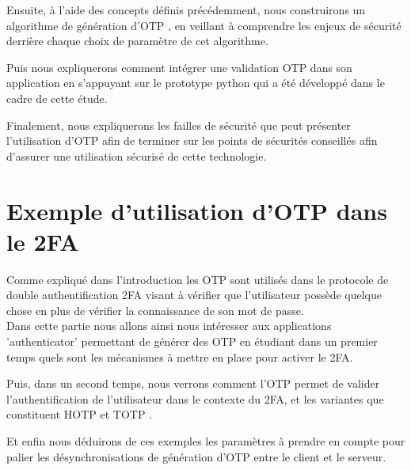 \documentclass[a4paper, 10pt]{article}
\newcommand{\otp}{\textsc{OTP} }
\newcommand{\totp}{\textsc{TOTP} }
\newcommand{\hotp}{\textsc{HOTP} }
\begin{document}
    Ensuite, à l'aide des concepts définis précédemment, nous construirons un \textcolor{myblue}{algorithme de génération d'\otp} , en veillant à comprendre les \textcolor{mygreen}{enjeux de sécurité} derrière chaque \textcolor{mygreen}{choix de paramètre} de cet algorithme.

    Puis nous expliquerons comment \textcolor{myblue}{intégrer une validation \otp} dans son application en s'appuyant sur le \textcolor{mygreen}{prototype python} qui a été développé dans le cadre de cette étude.

    Finalement, nous expliquerons les \textcolor{myblue}{failles de sécurité} que peut présenter l'utilisation d'\otp afin de terminer sur les \textcolor{mygreen}{points de sécurités conseillés} afin d'assurer une utilisation sécurisé de cette technologie.\\



\newpage
    \section{Exemple d'utilisation d'\otp dans le 2FA}


    Comme expliqué dans l'introduction les \otp sont utilisés dans le \textcolor{myblue}{protocole de double authentification} 2FA visant à vérifier que \textcolor{mygreen}{l'utilisateur possède quelque chose} en plus de vérifier la connaissance de son mot de passe.\\

    Dans cette partie nous allons ainsi nous intéresser aux \textcolor{myblue}{applications 'authenticator'} permettant de générer des \otp en étudiant dans un premier temps quels sont les \textcolor{mygreen}{mécanismes} à mettre en place \textcolor{mygreen}{pour activer le 2FA}. 
    
    Puis, dans un second temps, nous verrons comment l'\otp permet de \textcolor{myblue}{valider l'authentification} de l'utilisateur dans le contexte du 2FA, et \textcolor{myblue}{les variantes} que constituent \textcolor{mygreen}{\hotp} et \textcolor{mygreen}{\totp} . 
    
    Et enfin nous déduirons de ces exemples les paramètres à prendre en compte pour palier les \textcolor{myblue}{désynchronisations de génération d'\otp} entre le client et le serveur.


\end{document}
